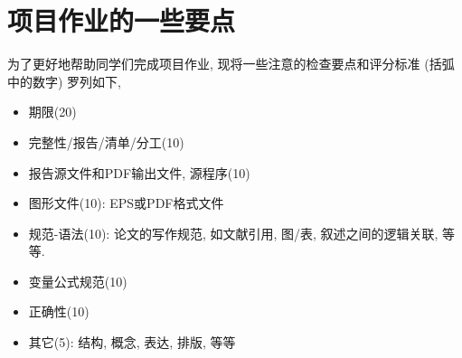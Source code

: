 \documentclass[10.5pt
]{article}
\begin{document}
\section*{项目作业的一些要点}
为了更好地帮助同学们完成项目作业, 现将一些注意的检查要点和评分标准 (括弧中的数字) 罗列如下,
\begin{itemize}
\item
期限(20)
\item
完整性/报告/清单/分工(10)
\item
报告源文件和PDF输出文件, 源程序(10)
\item
图形文件(10): EPS或PDF格式文件
\item
规范-语法(10): 论文的写作规范, 如文献引用, 图/表, 叙述之间的逻辑关联, 等等.
\item
变量公式规范(10)
\item
正确性(10)
\item
其它(5): 结构, 概念, 表达, 排版, 等等
\end{itemize}



\end{document}
